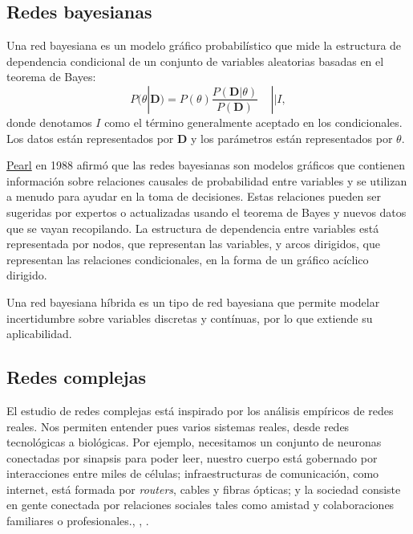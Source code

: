 \subsection{Redes bayesianas}
\begin{definicion}\label{def:BN}
Una red bayesiana es un modelo gráfico probabilístico que mide la estructura de dependencia condicional
de un conjunto de variables aleatorias basadas en el teorema de Bayes:\\
\begin{equation}
\label{eq:bayes}
P(\theta|\textbf{D}) = P(\theta ) \frac{P(\textbf{D} |\theta)}{P(\textbf{D})} ~~~~~|| I,
\end{equation}
donde denotamos $I$ como el término generalmente aceptado en los condicionales. Los datos están 
representados por \textbf{D} y los parámetros están representados por $\theta$.

\href{https://es.wikipedia.org/wiki/Judea_Pearl}{Pearl} en 1988 afirmó que las redes bayesianas 
son modelos gráficos que contienen información sobre 
relaciones causales de probabilidad entre variables y se utilizan a menudo para ayudar en la toma de decisiones. 
Estas relaciones pueden ser sugeridas por expertos o actualizadas usando el teorema de Bayes
y nuevos datos que se vayan recopilando. La estructura de dependencia entre variables está representada por nodos, 
que representan las variables, y arcos dirigidos, que representan las relaciones condicionales, en la forma
de un gráfico acíclico dirigido.\cite{YANG201919}
\end{definicion}

\begin{definicion}\label{def:hybrid_BN}
Una red bayesiana híbrida\cite{hybrid-BN} es un tipo de red bayesiana que permite modelar incertidumbre
sobre variables discretas y contínuas, por lo que extiende su aplicabilidad.
\end{definicion}

\subsection{Redes complejas}
El estudio de redes complejas está inspirado por los análisis empíricos de redes reales. Nos permiten entender 
pues varios sistemas reales, desde redes tecnológicas a biológicas. Por ejemplo, necesitamos un conjunto de 
neuronas conectadas por sinapsis para poder leer, nuestro cuerpo está gobernado por interacciones entre miles 
de células; infraestructuras de comunicación, como internet, está formada por \textit{routers}, cables y 
fibras ópticas; y la sociedad consiste en gente conectada por relaciones sociales tales como amistad y colaboraciones 
familiares o profesionales.\cite{albert2002statistical}, \cite{barrat2008dynamical}, \cite{dorogovtsev2003evolution}.

